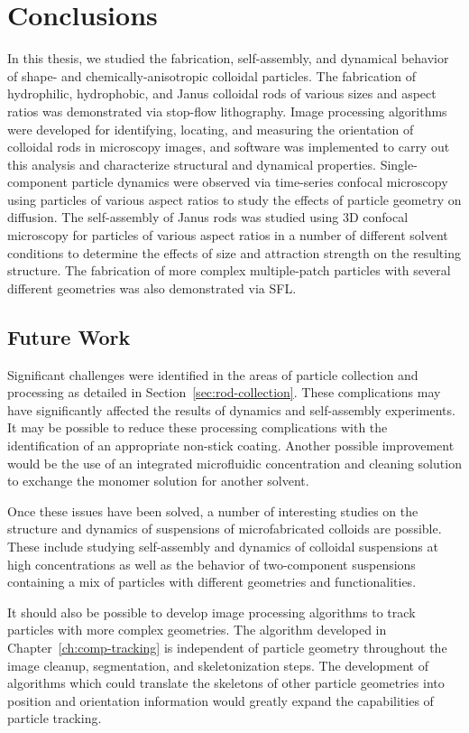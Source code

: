 \chapter{Conclusions}
\label{ch:conclusions}

In this thesis, we studied the fabrication, self-assembly, and dynamical behavior
of shape- and chemically-anisotropic colloidal particles.  The fabrication 
of hydrophilic, hydrophobic, and Janus colloidal rods of various sizes and aspect ratios was demonstrated via
stop-flow lithography.  Image processing algorithms
were developed for identifying, locating, and measuring the orientation of 
colloidal rods in microscopy images, and software was implemented to carry out
this analysis and characterize structural and dynamical properties.
Single-component particle 
dynamics were observed via time-series confocal microscopy using particles of 
various aspect ratios to study the effects of particle geometry on diffusion.
The self-assembly of Janus rods was studied using
3D confocal microscopy for particles of various aspect ratios
in a number of different solvent conditions to determine the effects of size 
and attraction strength on the resulting structure.  The fabrication of more complex
multiple-patch particles with several different geometries was also demonstrated via SFL.

\section{Future Work}

Significant challenges were identified in the areas of particle collection and processing as 
detailed in Section~\ref{sec:rod-collection}. These complications may have significantly affected the 
results of dynamics and self-assembly experiments.  It may be possible to reduce these
processing complications with the identification of 
an appropriate non-stick coating.  Another possible improvement would be the use of an
integrated microfluidic concentration
and cleaning solution to exchange the monomer solution for another solvent.

Once these issues have been solved, a number of interesting studies on the structure and
dynamics of suspensions of microfabricated colloids are possible.  These include studying 
self-assembly and dynamics of colloidal suspensions at high concentrations as well as 
the behavior of two-component suspensions containing a mix of particles with different geometries and
functionalities.

It should also be possible to develop image processing algorithms to track particles with more
complex geometries.  The algorithm developed in Chapter~\ref{ch:comp-tracking} is independent 
of particle geometry throughout the image cleanup, segmentation, and skeletonization steps.
The development of algorithms which could translate the skeletons of other particle 
geometries into position and orientation information would greatly expand the 
capabilities of particle tracking.
